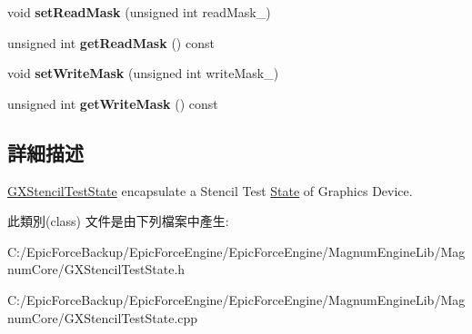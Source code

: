\begin{DoxyCompactItemize}
\item 
void {\bfseries set\+Read\+Mask} (unsigned int read\+Mask\+\_\+)\hypertarget{class_magnum_1_1_g_x_stencil_test_state_ad774d8dd5a8f330d2ce840cf08fa5241}{}\label{class_magnum_1_1_g_x_stencil_test_state_ad774d8dd5a8f330d2ce840cf08fa5241}

\item 
unsigned int {\bfseries get\+Read\+Mask} () const \hypertarget{class_magnum_1_1_g_x_stencil_test_state_a34bece65bef024ba90cb6298c978858f}{}\label{class_magnum_1_1_g_x_stencil_test_state_a34bece65bef024ba90cb6298c978858f}

\item 
void {\bfseries set\+Write\+Mask} (unsigned int write\+Mask\+\_\+)\hypertarget{class_magnum_1_1_g_x_stencil_test_state_a7371703148fc6c36ac9617d25fc5201c}{}\label{class_magnum_1_1_g_x_stencil_test_state_a7371703148fc6c36ac9617d25fc5201c}

\item 
unsigned int {\bfseries get\+Write\+Mask} () const \hypertarget{class_magnum_1_1_g_x_stencil_test_state_a7092ce6eca9d615d2fef19c825088175}{}\label{class_magnum_1_1_g_x_stencil_test_state_a7092ce6eca9d615d2fef19c825088175}

\end{DoxyCompactItemize}


\subsection{詳細描述}
\hyperlink{class_magnum_1_1_g_x_stencil_test_state}{G\+X\+Stencil\+Test\+State} encapsulate a Stencil Test \hyperlink{class_magnum_1_1_state}{State} of Graphics Device. 

此類別(class) 文件是由下列檔案中產生\+:\begin{DoxyCompactItemize}
\item 
C\+:/\+Epic\+Force\+Backup/\+Epic\+Force\+Engine/\+Epic\+Force\+Engine/\+Magnum\+Engine\+Lib/\+Magnum\+Core/G\+X\+Stencil\+Test\+State.\+h\item 
C\+:/\+Epic\+Force\+Backup/\+Epic\+Force\+Engine/\+Epic\+Force\+Engine/\+Magnum\+Engine\+Lib/\+Magnum\+Core/G\+X\+Stencil\+Test\+State.\+cpp\end{DoxyCompactItemize}
